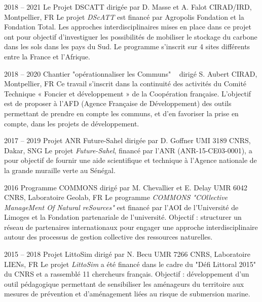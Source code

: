 \documentclass[]{cv-etienne}
\begin{document}
\begin{entrylist}
\entry
{2018 -- 2021}
{Le Projet DSCATT {\normalfont dirigée par D. Masse et A. Falot}}
{CIRAD/IRD, Montpellier, FR}
{
Le projet \emph{DScATT} est financé par Agropolis Fondation et la Fondation Total. Les approches interdisciplinaires mises en place dans ce projet ont pour objectif d'investiguer les possibilités de mobiliser le stockage du carbone dans les sols dans les pays du Sud. Le programme s'inscrit sur 4 sites différents entre la France et l'Afrique.
}
\end{entrylist}
\begin{entrylist}
\entry
{2018 -- 2020}
{Chantier "opérationnaliser les Communs" {\normalfont ~ dirigé S. Aubert}}
{CIRAD, Montpellier, FR}
{
Ce travail s'inscrit dans la continuité des activités du Comité Technique « Foncier et développement » de la Coopération française. L'objectif est de proposer à l'AFD (Agence Française de Développement) des outils permettant de prendre en compte les communs, et d'en favoriser la prise en compte, dans les projets de développement.
}
\end{entrylist}
\begin{entrylist}
\entry
{2017 -- 2019}
{Projet ANR Future-Sahel {\normalfont dirigée par D. Goffner}}
{UMI 3189 CNRS, Dakar, SNG}
{
Le projet \emph{Future-Sahel}, financé par l'ANR (ANR-15-CE03-0001), a pour objectif de fournir une aide scientifique et technique à l'Agence nationale de la grande muraille verte au Sénégal.
}
\end{entrylist}
\begin{entrylist}
\entry
{2016}
{Programme COMMONS {\normalfont dirigé par M. Chevallier et E. Delay}}
{UMR 6042 CNRS, Laboratoire Geolab, FR}
{
Le programme \emph{COMMONS "\textit{COllective ManageMent Of Natural reSources}"} est financé par l'AOI de l'Université de Limoges et la Fondation partenariale de l'université. Objectif : structurer un réseau de partenaires internationaux pour engager une approche interdisciplinaire autour des processus de gestion collective des ressources naturelles.
}
\end{entrylist}
\begin{entrylist}
\entry
{2015 -- 2018}
{Projet LittoSim {\normalfont dirigé par N. Becu}}
{UMR 7266 CNRS, Laboratoire LIENs, FR}
{
Le projet \emph{LittoSim} a été financé dans le cadre du "Défi Littoral 2015" du CNRS et a rassemblé 11 chercheurs français. Objectif : développement d'un outil pédagogique permettant de sensibiliser les aménageurs du territoire aux mesures de prévention et d'aménagement liées au risque de submersion marine.
}
\end{entrylist}
\end{document}
